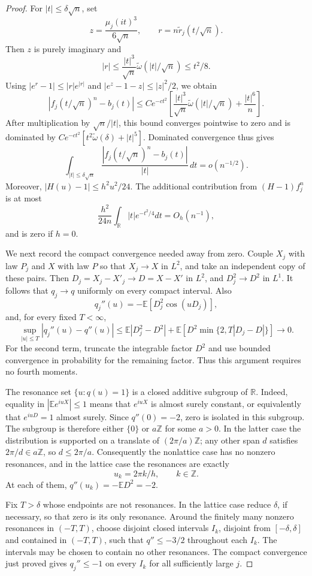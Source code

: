 \documentclass[aop]{imsart}
\theoremstyle{plain}
\theoremstyle{definition}
\theoremstyle{definition}
\newcommand{\EE}{\mathbb E}
\newcommand{\R}{\mathbb R}
\begin{document}
\begin{proof}
For \(|t|\le\delta\sqrt n\), set
\[
 z=\frac{\mu_j(it)^3}{6\sqrt n},\qquad
 r=n\widetilde r_j(t/\sqrt n).
\]
Then \(z\) is purely imaginary and
\[
 |r|\le\frac{|t|^3}{\sqrt n}\widetilde\omega(|t|/\sqrt n)
 \le t^2/8.
\]
Using \(|e^r-1|\le|r|e^{|r|}\) and
\(|e^z-1-z|\le|z|^2/2\), we obtain
\[
 |f_j(t/\sqrt n)^n-b_j(t)|
 \le Ce^{-ct^2}\left[
 \frac{|t|^3}{\sqrt n}\widetilde\omega(|t|/\sqrt n)
 +\frac{|t|^6}{n}\right].
\]
After multiplication by \(\sqrt n/|t|\), this bound converges pointwise
to zero and is dominated by
\(Ce^{-ct^2}[t^2\widetilde\omega(\delta)+|t|^5]\).  Dominated convergence
thus gives
\[
 \int_{|t|\le\delta\sqrt n}
   \frac{|f_j(t/\sqrt n)^n-b_j(t)|}{|t|}\,dt=o(n^{-1/2}).
\]
Moreover, \(|H(u)-1|\le h^2u^2/24\).  The additional contribution from
\((H-1)f_j^n\) is at most
\[
 \frac{h^2}{24n}\int_{\R}|t|e^{-t^2/4}dt=O_h(n^{-1}),
\]
and is zero if \(h=0\).

We next record the compact convergence needed away from zero.  Couple
\(X_j\) with law \(P_j\) and \(X\) with law \(P\) so that
\(X_j\to X\) in \(L^2\), and take an independent copy of these pairs.
Then \(D_j=X_j-X'_j\to D=X-X'\) in \(L^2\), and
\(D_j^2\to D^2\) in \(L^1\).  It follows that \(q_j\to q\) uniformly
on every compact interval.  Also
\[
 q_j''(u)=-\EE[D_j^2\cos(uD_j)],
\]
and, for every fixed \(T<\infty\),
\[
 \sup_{|u|\le T}|q_j''(u)-q''(u)|
 \le\EE|D_j^2-D^2|
   +\EE\left[D^2\min\{2,T|D_j-D|\}\right]\longrightarrow0.
\]
For the second term, truncate the integrable factor \(D^2\) and use
bounded convergence in probability for the remaining factor.  Thus this
argument requires no fourth moments.

The resonance set \(\{u:q(u)=1\}\) is a closed additive subgroup of
\(\R\).  Indeed, equality in \(|\EE e^{iuX}|\le1\) means that
\(e^{iuX}\) is almost surely constant, or equivalently that
\(e^{iuD}=1\) almost surely.  Since \(q''(0)=-2\), zero is isolated in
this subgroup.  The subgroup is therefore either \(\{0\}\) or
\(a\mathbb Z\) for some \(a>0\).  In the latter case the distribution
is supported on a translate of \((2\pi/a)\mathbb Z\); any other span
\(d\) satisfies \(2\pi/d\in a\mathbb Z\), so \(d\le2\pi/a\).
Consequently the nonlattice case has no nonzero resonances, and in the
lattice case the resonances are exactly
\[
 u_k=2\pi k/h,\qquad k\in\mathbb Z.
\]
At each of them, \(q''(u_k)=-\EE D^2=-2\).

Fix \(T>\delta\) whose endpoints are not resonances.  In the lattice
case reduce \(\delta\), if necessary, so that zero is its only resonance.
Around the finitely many nonzero resonances in \((-T,T)\), choose
disjoint closed intervals \(I_k\), disjoint from \([-\delta,\delta]\)
and contained in \((-T,T)\), such that \(q''\le-3/2\) throughout
each \(I_k\).  The intervals may be chosen to contain no other
resonances.  The compact convergence just proved gives \(q_j''\le-1\)
on every \(I_k\) for all sufficiently large \(j\).


\end{proof}
\end{document}
